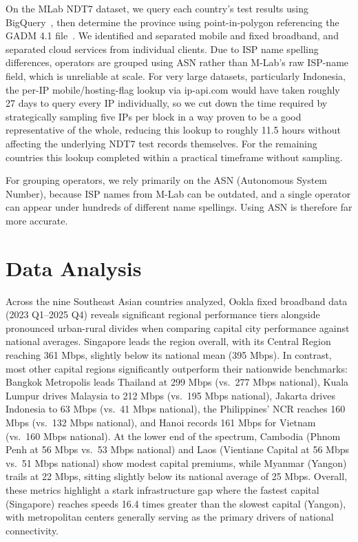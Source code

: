 \documentclass[sigconf,anonymous,review]{acmart}
\begin{document}
On the MLab NDT7 dataset, we query each country's test results using
BigQuery~\cite{BigQuery}, then determine the province using
point-in-polygon referencing the GADM 4.1 file~\cite{GADM2022}. We
identified and separated mobile and fixed broadband, and separated cloud
services from individual clients. Due to ISP name spelling differences,
operators are grouped using ASN rather than M-Lab's raw ISP-name field,
which is unreliable at scale. For very large datasets, particularly
Indonesia, the per-IP mobile/hosting-flag lookup via ip-api.com would have
taken roughly 27 days to query every IP individually, so we cut down the
time required by strategically sampling five IPs per block in a way proven
to be a good representative of the whole, reducing this lookup to roughly
11.5 hours without affecting the underlying NDT7 test records themselves.
For the remaining countries this lookup completed within a practical
timeframe without sampling.

For grouping operators, we rely primarily on the ASN (Autonomous System
Number), because ISP names from M-Lab can be outdated, and a single
operator can appear under hundreds of different name spellings. Using ASN
is therefore far more accurate.

\section{Data Analysis}
Across the nine Southeast Asian countries analyzed, Ookla fixed broadband
data (2023 Q1--2025 Q4) reveals significant regional performance tiers
alongside pronounced urban-rural divides when comparing capital city
performance against national averages. Singapore leads the region overall,
with its Central Region reaching 361 Mbps, slightly below its national mean
(395 Mbps). In contrast, most other capital regions significantly
outperform their nationwide benchmarks: Bangkok Metropolis leads Thailand
at 299 Mbps (vs.\ 277 Mbps national), Kuala Lumpur drives Malaysia to
212 Mbps (vs.\ 195 Mbps national), Jakarta drives Indonesia to 63 Mbps
(vs.\ 41 Mbps national), the Philippines' NCR reaches 160 Mbps (vs.\ 132
Mbps national), and Hanoi records 161 Mbps for Vietnam (vs.\ 160 Mbps
national). At the lower end of the spectrum, Cambodia (Phnom Penh at
56 Mbps vs.\ 53 Mbps national) and Laos (Vientiane Capital at 56 Mbps vs.\
51 Mbps national) show modest capital premiums, while Myanmar (Yangon)
trails at 22 Mbps, sitting slightly below its national average of 25 Mbps.
Overall, these metrics highlight a stark infrastructure gap where the
fastest capital (Singapore) reaches speeds 16.4 times greater than the
slowest capital (Yangon), with metropolitan centers generally serving as
the primary drivers of national connectivity.
\end{document}
